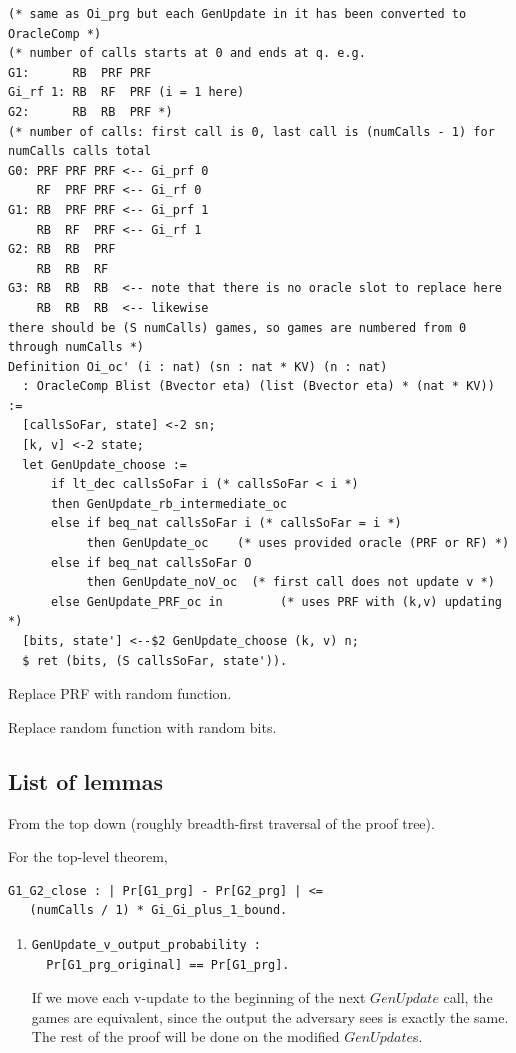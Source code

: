 \documentclass[12pt,lot, lof]{puthesis}
\begin{document}
{\begin{lstlisting}
(* same as Oi_prg but each GenUpdate in it has been converted to OracleComp *)
(* number of calls starts at 0 and ends at q. e.g.
G1:      RB  PRF PRF
Gi_rf 1: RB  RF  PRF (i = 1 here)
G2:      RB  RB  PRF *)
(* number of calls: first call is 0, last call is (numCalls - 1) for numCalls calls total
G0: PRF PRF PRF <-- Gi_prf 0
    RF  PRF PRF <-- Gi_rf 0
G1: RB  PRF PRF <-- Gi_prf 1
    RB  RF  PRF <-- Gi_rf 1
G2: RB  RB  PRF
    RB  RB  RF
G3: RB  RB  RB  <-- note that there is no oracle slot to replace here
    RB  RB  RB  <-- likewise
there should be (S numCalls) games, so games are numbered from 0 through numCalls *)
Definition Oi_oc' (i : nat) (sn : nat * KV) (n : nat) 
  : OracleComp Blist (Bvector eta) (list (Bvector eta) * (nat * KV)) :=
  [callsSoFar, state] <-2 sn;
  [k, v] <-2 state;
  let GenUpdate_choose := 
      if lt_dec callsSoFar i (* callsSoFar < i *)
      then GenUpdate_rb_intermediate_oc
      else if beq_nat callsSoFar i (* callsSoFar = i *)
           then GenUpdate_oc    (* uses provided oracle (PRF or RF) *)
      else if beq_nat callsSoFar O 
           then GenUpdate_noV_oc  (* first call does not update v *)
      else GenUpdate_PRF_oc in        (* uses PRF with (k,v) updating *)
  [bits, state'] <--$2 GenUpdate_choose (k, v) n;
  $ ret (bits, (S callsSoFar, state')).
  \end{lstlisting}

Replace PRF with random function.

Replace random function with random bits.

\subsection{List of lemmas}

From the top down (roughly breadth-first traversal of the proof tree).

For the top-level theorem, 
\begin{lstlisting}
G1_G2_close : | Pr[G1_prg] - Pr[G2_prg] | <= 
   (numCalls / 1) * Gi_Gi_plus_1_bound.
\end{lstlisting}
\begin{enumerate}
\par
\item \begin{lstlisting}
GenUpdate_v_output_probability :
  Pr[G1_prg_original] == Pr[G1_prg].
  \end{lstlisting}
If we move each v-update to the beginning of the next $GenUpdate$ call, the games are equivalent, since the output the adversary sees is exactly the same. The rest of the proof will be done on the modified $GenUpdate$s.


\end{enumerate}}
\end{document}
